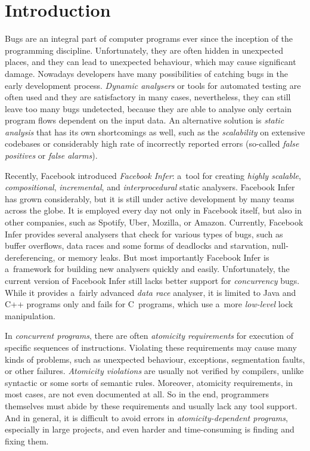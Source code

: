 

\chapter{Introduction}

Bugs are an integral part of computer programs ever since the inception
of the programming discipline. Unfortunately, they are often hidden
in unexpected places, and they can lead to unexpected behaviour, which
may cause significant damage. Nowadays developers have many possibilities
of catching bugs in the early development process. \emph{Dynamic analysers}
or tools for automated testing are often used and they are satisfactory in 
many cases, nevertheless, they can still leave too many bugs undetected, 
because they are able to analyse only certain program flows dependent on 
the input data. An alternative solution is \emph{static analysis} that has 
its own shortcomings as well, such as the \emph{scalability} on extensive
codebases or considerably high rate of incorrectly reported errors 
(so-called \emph{false positives} or \emph{false alarms}).

Recently, Facebook introduced \emph{Facebook Infer}: a~tool for
creating \emph{highly scalable}, \emph{compositional}, \emph{incremental},
and \emph{interprocedural} static analysers. Facebook Infer has grown
considerably, but it is still under active development
by many teams across the globe. It is employed every day not only in
Facebook itself, but also in other companies, such as Spotify, Uber, Mozilla,
or Amazon. Currently, Facebook Infer provides several analysers that check 
for various types
of bugs, such as buffer overflows, data races and some forms of deadlocks
and starvation, null-dereferencing, or memory leaks. But most importantly
Facebook Infer is a~framework for building new analysers quickly and easily.
Unfortunately, the current version of Facebook Infer still lacks better 
support for \emph{concurrency} bugs. While it provides a~fairly advanced
\emph{data race} analyser, it is limited to Java and C++ programs only and 
fails for C~programs, which use a~more \emph{low-level} lock manipulation.

In \emph{concurrent programs}, there are often \emph{atomicity requirements}
for execution of specific sequences of instructions. Violating these
requirements may cause many kinds of problems, such as unexpected
behaviour, exceptions, segmentation faults, or other failures.
\emph{Atomicity violations} are usually not verified by compilers,
unlike syntactic or some sorts of semantic rules. Moreover, atomicity
requirements, in most cases, are not even documented at all. So in the
end, programmers themselves must abide by these requirements and usually
lack any tool support. And in general, it is difficult to avoid
errors in \emph{atomicity-dependent programs}, especially in large projects,
and even harder and time-consuming is finding and fixing them.

